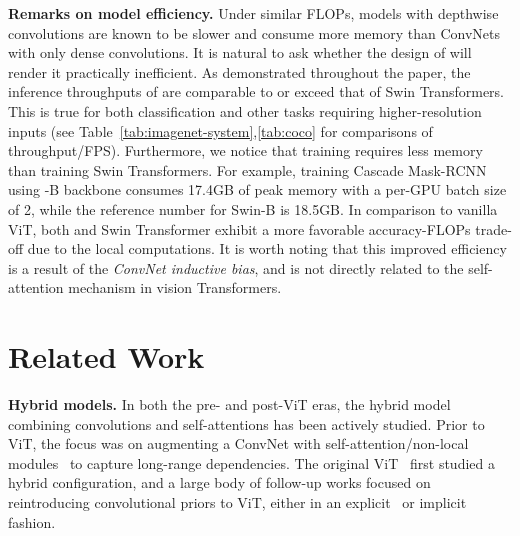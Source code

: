 \documentclass[10pt,twocolumn,letterpaper]{article}
\renewcommand{\paragraph}[1]{\vspace{1.25mm}\noindent\textbf{#1}}
\begin{document}
\paragraph{Remarks on model efficiency.} Under similar FLOPs, models with depthwise convolutions are known to be slower and consume more memory than ConvNets with only dense convolutions. It is natural to ask whether the design of \cnn{} will render it practically inefficient. As demonstrated throughout the paper, the inference throughputs of  are comparable to or exceed that of Swin Transformers. This is true for both classification and other tasks requiring higher-resolution inputs (see Table~\ref{tab:imagenet-system},\ref{tab:coco} for comparisons of throughput/FPS). Furthermore, we notice that training  requires less memory than training Swin Transformers. For example, training Cascade Mask-RCNN using \cnn{}-B backbone consumes 17.4GB of peak memory with a per-GPU batch size of 2, while the reference number for Swin-B is 18.5GB.
In comparison to vanilla ViT, both \cnn{} and Swin Transformer exhibit a more favorable accuracy-FLOPs trade-off due to the local computations. It is worth noting that this improved efficiency is a result of the \emph{ConvNet inductive bias}, and is not directly related to the self-attention mechanism in vision Transformers.


\section{Related Work}
\paragraph{Hybrid models.} 
In both the pre- and post-ViT eras, the hybrid model combining convolutions and self-attentions has been actively studied. 
Prior to ViT, the focus was on augmenting a ConvNet with self-attention/non-local modules~\cite{Wang2018,bello2019attention,srinivas2021bottleneck,ramachandran2019stand} to capture long-range dependencies.
The original ViT~\cite{Dosovitskiy2021} first studied a hybrid configuration, and a large body of follow-up works focused on reintroducing convolutional priors to ViT, either in an explicit~\cite{wu2021cvt, xu2021co, d2021convit, dai2021coatnet,Xiao2021, fan2021multiscale} or implicit~\cite{Liu2021swin} fashion.
\end{document}
